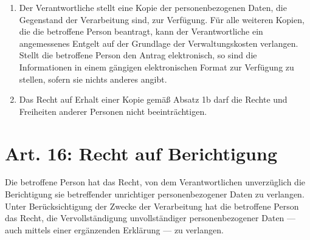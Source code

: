 \documentclass[A4, 12pt]{scrbook}
\begin{document}
\begin{enumerate}[label=(\arabic*)]
            \item Der Verantwortliche stellt eine Kopie der personenbezogenen Daten, die Gegenstand der Verarbeitung sind, zur Verfügung. Für alle weiteren Kopien, die die betroffene Person beantragt, kann der Verantwortliche ein angemessenes Entgelt auf der Grundlage der Verwaltungskosten verlangen. Stellt die betroffene Person den Antrag elektronisch, so sind die Informationen in einem gängigen elektronischen Format zur Verfügung zu stellen, sofern sie nichts anderes angibt.
            \item Das Recht auf Erhalt einer Kopie gemäß Absatz 1b darf die Rechte und Freiheiten anderer Personen nicht beeinträchtigen. 
        \end{enumerate}

    \section{Art. 16: Recht auf Berichtigung}
        Die betroffene Person hat das Recht, von dem Verantwortlichen unverzüglich die Berichtigung sie betreffender unrichtiger personenbezogener Daten zu verlangen. Unter Berücksichtigung der Zwecke der Verarbeitung hat die betroffene Person das Recht, die Vervollständigung unvollständiger personenbezogener Daten — auch mittels einer ergänzenden Erklärung — zu verlangen.
\end{document}
